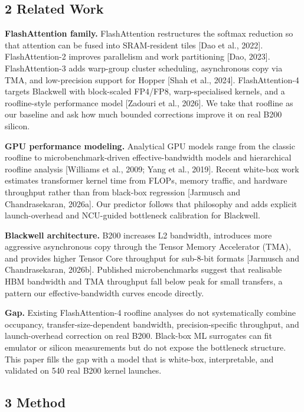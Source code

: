\subsection{2 Related Work}\label{related-work}

\textbf{FlashAttention family.} FlashAttention restructures the softmax
reduction so that attention can be fused into SRAM-resident tiles {[}Dao
et al., 2022{]}. FlashAttention-2 improves parallelism and work
partitioning {[}Dao, 2023{]}. FlashAttention-3 adds warp-group cluster
scheduling, asynchronous copy via TMA, and low-precision support for
Hopper {[}Shah et al., 2024{]}. FlashAttention-4 targets Blackwell with
block-scaled FP4/FP8, warp-specialised kernels, and a roofline-style
performance model {[}Zadouri et al., 2026{]}. We take that roofline as
our baseline and ask how much bounded corrections improve it on real
B200 silicon.

\textbf{GPU performance modeling.} Analytical GPU models range from the
classic roofline to microbenchmark-driven effective-bandwidth models and
hierarchical roofline analysis {[}Williams et al., 2009; Yang et al.,
2019{]}. Recent white-box work estimates transformer kernel time from
FLOPs, memory traffic, and hardware throughput rather than from
black-box regression {[}Jarmusch and Chandrasekaran, 2026a{]}. Our
predictor follows that philosophy and adds explicit launch-overhead and
NCU-guided bottleneck calibration for Blackwell.

\textbf{Blackwell architecture.} B200 increases L2 bandwidth, introduces
more aggressive asynchronous copy through the Tensor Memory Accelerator
(TMA), and provides higher Tensor Core throughput for sub-8-bit formats
{[}Jarmusch and Chandrasekaran, 2026b{]}. Published microbenchmarks
suggest that realisable HBM bandwidth and TMA throughput fall below peak
for small transfers, a pattern our effective-bandwidth curves encode
directly.

\textbf{Gap.} Existing FlashAttention-4 roofline analyses do not
systematically combine occupancy, transfer-size-dependent bandwidth,
precision-specific throughput, and launch-overhead correction on real
B200. Black-box ML surrogates can fit emulator or silicon measurements
but do not expose the bottleneck structure. This paper fills the gap
with a model that is white-box, interpretable, and validated on 540 real
B200 kernel launches.

\subsection{3 Method}\label{method}


